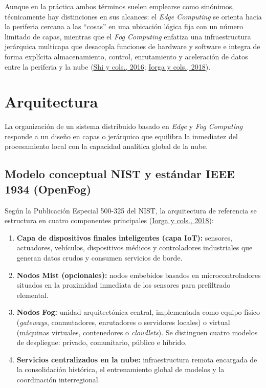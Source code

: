 \documentclass[12pt, letterpaper]{article}
\begin{document}
Aunque en la práctica ambos términos suelen emplearse como sinónimos, técnicamente hay distinciones en sus alcances: el \textit{Edge Computing} se orienta hacia la periferia cercana a las ``cosas'' en una ubicación lógica fija con un número limitado de capas, mientras que el \textit{Fog Computing} enfatiza una infraestructura jerárquica multicapa que desacopla funciones de hardware y software e integra de forma explícita almacenamiento, control, enrutamiento y aceleración de datos entre la periferia y la nube (\protect\hyperlink{shi2016}{Shi y cols., 2016}; \protect\hyperlink{iorga2018}{Iorga y cols., 2018}).

\section{Arquitectura}

La organización de un sistema distribuido basado en \textit{Edge} y \textit{Fog Computing} responde a un diseño en capas o jerárquico que equilibra la inmediatez del procesamiento local con la capacidad analítica global de la nube.

\subsection{Modelo conceptual NIST y estándar IEEE 1934 (OpenFog)}

Según la Publicación Especial 500-325 del NIST, la arquitectura de referencia se estructura en cuatro componentes principales (\protect\hyperlink{iorga2018}{Iorga y cols., 2018}):

\begin{enumerate}
    \item \textbf{Capa de dispositivos finales inteligentes (capa IoT):} sensores, actuadores, vehículos, dispositivos médicos y controladores industriales que generan datos crudos y consumen servicios de borde.
    \item \textbf{Nodos Mist (opcionales):} nodos embebidos basados en microcontroladores situados en la proximidad inmediata de los sensores para prefiltrado elemental.
    \item \textbf{Nodos Fog:} unidad arquitectónica central, implementada como equipo físico (\textit{gateways}, conmutadores, enrutadores o servidores locales) o virtual (máquinas virtuales, contenedores o \textit{cloudlets}). Se distinguen cuatro modelos de despliegue: privado, comunitario, público e híbrido.
    \item \textbf{Servicios centralizados en la nube:} infraestructura remota encargada de la consolidación histórica, el entrenamiento global de modelos y la coordinación interregional.
\end{enumerate}
\end{document}

